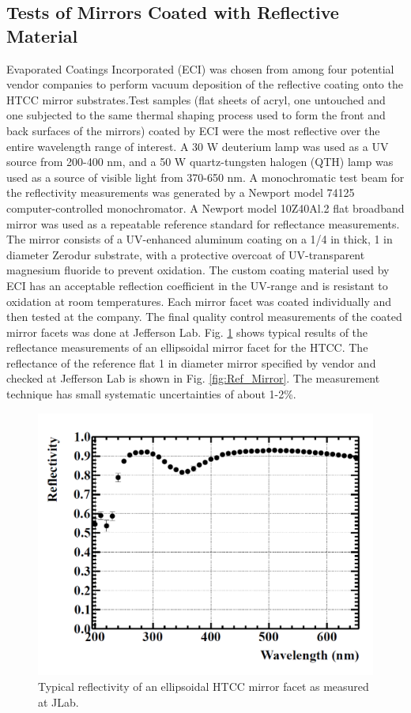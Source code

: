 \subsection{Tests of Mirrors Coated with Reflective Material}
Evaporated Coatings Incorporated (ECI) was chosen from among four potential vendor companies to perform vacuum deposition of the reflective coating onto the HTCC mirror substrates.Test samples (flat sheets of acryl, one untouched and one subjected to the same thermal shaping process used to form the front and back surfaces of the mirrors) coated by ECI were the most reflective over the entire wavelength range of interest. A 30 W deuterium lamp was used as a UV source from 200-400 nm, and a 50 W quartz-tungsten halogen (QTH) lamp was used as a source of visible light from 370-650 nm. A monochromatic test beam for the reflectivity measurements was generated by a Newport model 74125 computer-controlled monochromator. A Newport model 10Z40Al.2 flat broadband mirror was used as a repeatable reference standard for reflectance measurements. The mirror consists of a UV-enhanced aluminum coating on a 1/4 in thick, 1 in diameter Zerodur substrate, with a protective overcoat of UV-transparent magnesium fluoride to prevent oxidation.
The custom coating material used by ECI has an acceptable reflection coefficient in the UV-range and is resistant to oxidation at room temperatures. Each mirror facet was coated individually and then tested at the company. The final quality control measurements of the coated mirror facets was done at Jefferson Lab. Fig. \ref{fig:JLab_Mirror}  shows typical results of the reflectance  measurements of an ellipsoidal mirror facet for the HTCC. The reflectance of the reference flat 1 in diameter mirror specified by vendor and checked at Jefferson Lab is shown in Fig. \ref{fig:Ref_Mirror}. The measurement technique has small systematic uncertainties of about 1-2\%.

\begin{figure}[ht]
    \centering
    \includegraphics[width=1.0\linewidth]{images/JLab_Mirror}
    \caption{Typical reflectivity of an ellipsoidal HTCC mirror facet as measured at JLab.}
    \label{fig:JLab_Mirror}
\end{figure}


